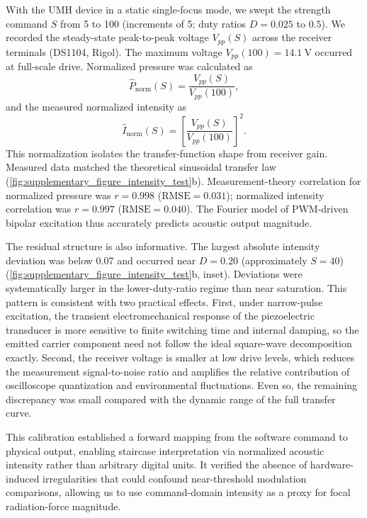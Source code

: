 \documentclass[pdflatex, sn-nature]{sn-jnl}
\theoremstyle{thmstyleone}%
\theoremstyle{thmstyletwo}%
\theoremstyle{thmstylethree}%
\begin{document}
With the UMH device in a static single-focus mode, we swept the strength command $S$ from 5 to 100 (increments of 5; duty ratios $D=0.025$ to $0.5$). We recorded the steady-state peak-to-peak voltage $V_{pp}(S)$ across the receiver terminals (DS1104, Rigol). The maximum voltage $V_{pp}(100)=\qty{14.1}{\volt}$ occurred at full-scale drive. Normalized pressure was calculated as
\begin{equation}
    \widehat{P}_{\mathrm{norm}}(S)=\frac{V_{pp}(S)}{V_{pp}(100)},
\end{equation}
and the measured normalized intensity as
\begin{equation}
    \widehat{I}_{\mathrm{norm}}(S)=\left[\frac{V_{pp}(S)}{V_{pp}(100)}\right]^2.
\end{equation}
This normalization isolates the transfer-function shape from receiver gain. Measured data matched the theoretical sinusoidal transfer law (\cref{fig:supplementary_figure_intensity_test}b). Measurement-theory correlation for normalized pressure was $r=0.998$ ($\mathrm{RMSE}=0.031$); normalized intensity correlation was $r=0.997$ ($\mathrm{RMSE}=0.040$). The Fourier model of PWM-driven bipolar excitation thus accurately predicts acoustic output magnitude.

The residual structure is also informative. The largest absolute intensity deviation was below 0.07 and occurred near $D=0.20$ (approximately $S=40$) (\cref{fig:supplementary_figure_intensity_test}b, inset). Deviations were systematically larger in the lower-duty-ratio regime than near saturation. This pattern is consistent with two practical effects. First, under narrow-pulse excitation, the transient electromechanical response of the piezoelectric transducer is more sensitive to finite switching time and internal damping, so the emitted carrier component need not follow the ideal square-wave decomposition exactly. Second, the receiver voltage is smaller at low drive levels, which reduces the measurement signal-to-noise ratio and amplifies the relative contribution of oscilloscope quantization and environmental fluctuations. Even so, the remaining discrepancy was small compared with the dynamic range of the full transfer curve.

This calibration established a forward mapping from the software command to physical output, enabling staircase interpretation via normalized acoustic intensity rather than arbitrary digital units. It verified the absence of hardware-induced irregularities that could confound near-threshold modulation comparisons, allowing us to use command-domain intensity as a proxy for focal radiation-force magnitude.
\end{document}

